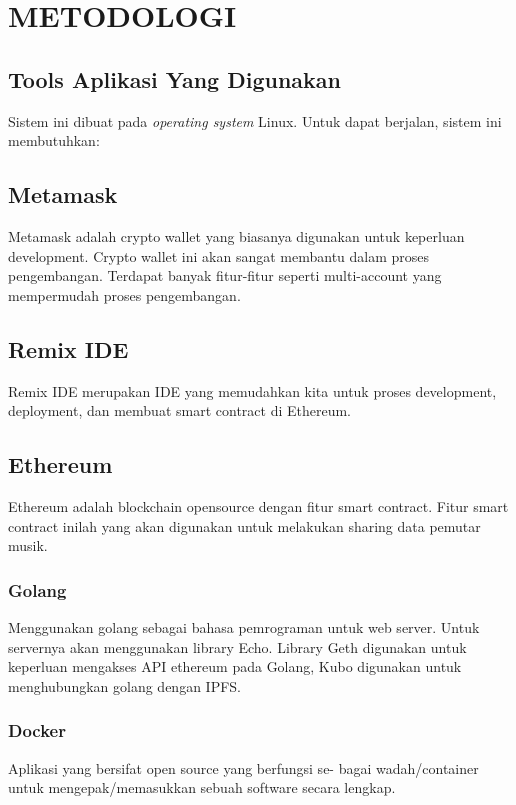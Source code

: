 \section{METODOLOGI}


\subsection{Tools Aplikasi Yang Digunakan}

Sistem ini dibuat pada \emph{operating system} Linux. Untuk dapat
berjalan, sistem ini membutuhkan:

\subsection{Metamask}
Metamask adalah crypto wallet yang biasanya digunakan untuk keperluan development. Crypto wallet ini
akan sangat membantu dalam proses pengembangan. Terdapat banyak fitur-fitur seperti multi-account yang mempermudah proses pengembangan.

\subsection{Remix IDE}
Remix IDE merupakan IDE yang memudahkan kita untuk proses development, deployment, dan membuat smart contract di Ethereum.

\subsection{Ethereum}
Ethereum adalah blockchain opensource dengan fitur smart contract. Fitur smart contract inilah yang akan digunakan untuk 
melakukan sharing data pemutar musik.


\subsubsection{Golang}
Menggunakan golang sebagai bahasa pemrograman untuk web server. Untuk servernya akan menggunakan library Echo. Library Geth
digunakan untuk keperluan mengakses API ethereum pada Golang, Kubo digunakan untuk menghubungkan golang dengan IPFS.

\subsubsection{Docker}
Aplikasi yang bersifat open source yang berfungsi se-
bagai wadah/container untuk mengepak/memasukkan sebuah
software secara lengkap.

